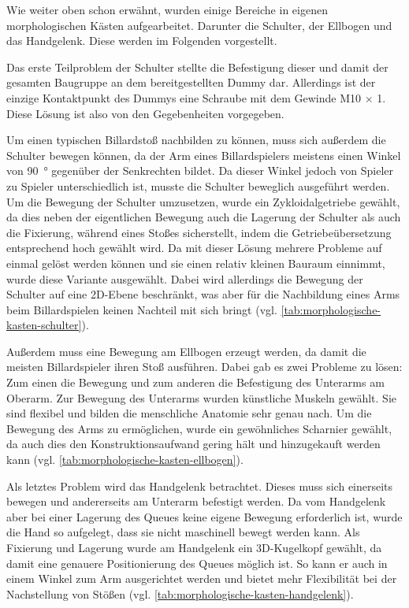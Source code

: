 		Wie weiter oben schon erwähnt, wurden einige Bereiche in eigenen morphologischen Kästen aufgearbeitet. Darunter die Schulter, der Ellbogen und das Handgelenk. Diese werden im Folgenden vorgestellt.\par\medskip

		Das erste Teilproblem der Schulter stellte die Befestigung dieser und damit der gesamten Baugruppe an dem bereitgestellten Dummy dar. Allerdings ist der einzige Kontaktpunkt des Dummys eine Schraube mit dem Gewinde M10 $\times$ 1. Diese Lösung ist also von den Gegebenheiten vorgegeben.\par\medskip

		Um einen typischen Billardstoß nachbilden zu können, muss sich außerdem die Schulter bewegen können, da der Arm eines Billardspielers meistens einen Winkel von \SI{90}{\degree} gegenüber der Senkrechten bildet. Da dieser Winkel jedoch von Spieler zu Spieler unterschiedlich ist, musste die Schulter beweglich ausgeführt werden. Um die Bewegung der Schulter umzusetzen, wurde ein Zykloidalgetriebe gewählt, da dies neben der eigentlichen Bewegung auch die Lagerung der Schulter als auch die Fixierung, während eines Stoßes sicherstellt, indem die Getriebeübersetzung entsprechend hoch gewählt wird. Da mit dieser Lösung mehrere Probleme auf einmal gelöst werden können und sie einen relativ kleinen Bauraum einnimmt, wurde diese Variante ausgewählt. Dabei wird allerdings die Bewegung der Schulter auf eine 2D-Ebene beschränkt, was aber für die Nachbildung eines Arms beim Billardspielen keinen Nachteil mit sich bringt (vgl. \cref{tab:morphologische-kasten-schulter}).\par\medskip

		Außerdem muss eine Bewegung am Ellbogen erzeugt werden, da damit die meisten Billardspieler ihren Stoß ausführen. Dabei gab es zwei Probleme zu lösen: Zum einen die Bewegung und zum anderen die Befestigung des Unterarms am Oberarm. Zur Bewegung des Unterarms wurden künstliche Muskeln gewählt. Sie sind flexibel und bilden die menschliche Anatomie sehr genau nach. Um die Bewegung des Arms zu ermöglichen, wurde ein gewöhnliches Scharnier gewählt, da auch dies den Konstruktionsaufwand gering hält und hinzugekauft werden kann (vgl. \cref{tab:morphologische-kasten-ellbogen}).\par\medskip

		Als letztes Problem wird das Handgelenk betrachtet. Dieses muss sich einerseits bewegen und andererseits am Unterarm befestigt werden. Da vom Handgelenk aber bei einer Lagerung des Queues keine eigene Bewegung erforderlich ist, wurde die Hand so aufgelegt, dass sie nicht maschinell bewegt werden kann. Als Fixierung und Lagerung wurde am Handgelenk ein 3D-Kugelkopf gewählt, da damit eine genauere Positionierung des Queues möglich ist. So kann er auch in einem Winkel zum Arm ausgerichtet werden und bietet mehr Flexibilität bei der Nachstellung von Stößen (vgl. \cref{tab:morphologische-kasten-handgelenk}).
